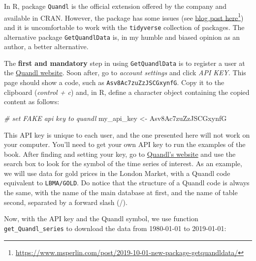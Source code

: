 \documentclass[
  12pt,
]{book}
\newenvironment{Shaded}{\begin{snugshade}}{\end{snugshade}}
\newcommand{\CommentTok}[1]{\textcolor[rgb]{0.37,0.37,0.37}{\textit{#1}}}
\newcommand{\NormalTok}[1]{#1}
\newcommand{\OtherTok}[1]{\textcolor[rgb]{0.37,0.37,0.37}{#1}}
\newcommand{\StringTok}[1]{\textcolor[rgb]{0.5,0.5,0.5}{#1}}
\begin{document}
In R, package \texttt{Quandl} \citep{R-Quandl} is the official extension offered by the company and available in CRAN. However, the package has some issues (see \href{https://www.msperlin.com/post/2019-10-01-new-package-getquandldata/}{blog post here}\footnote{\url{https://www.msperlin.com/post/2019-10-01-new-package-getquandldata/}}) and it is uncomfortable to work with the \texttt{tidyverse} collection of packages. The alternative package \texttt{GetQuandlData} \citep{R-GetQuandlData} is, in my humble and biased opinion as an author, a better alternative.

The \textbf{first and mandatory} step in using \texttt{GetQuandlData} is to register a user at the \href{https://www.quandl.com/}{Quandl website}. Soon after, go to \emph{account settings} and click \emph{API KEY}. This page should show a code, such as \texttt{Asv8Ac7zuZzJSCGxynfG}. Copy it to the clipboard (\emph{control + c}) and, in R, define a character object containing the copied content as follows:

\begin{Shaded}
\begin{Highlighting}[]
\CommentTok{\# set FAKE api key to quandl}
\NormalTok{my\_api\_key }\OtherTok{\textless{}{-}} \StringTok{\textquotesingle{}Asv8Ac7zuZzJSCGxynfG\textquotesingle{}}
\end{Highlighting}
\end{Shaded}

This API key is unique to each user, and the one presented here will not work on your computer. You'll need to get your own API key to run the examples of the book. After finding and setting your key, go to \href{https://www.quandl.com/search?query=}{Quandl's website} and use the search box to look for the symbol of the time series of interest. As an example, we will use data for gold prices in the London Market, with a Quandl code equivalent to \texttt{\textquotesingle{}LBMA/GOLD\textquotesingle{}}. Do notice that the structure of a Quandl code is always the same, with the name of the main database at first, and the name of table second, separated by a forward slash (/).

Now, with the API key and the Quandl symbol, we use function \texttt{get\_Quandl\_series} to download the data from 1980-01-01 to 2019-01-01:  
\end{document}
